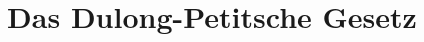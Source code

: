 

\subject{Versuch 201}
\title{Das Dulong-Petitsche Gesetz}


    \maketitle
    \thispagestyle{empty}
    \tableofcontents
    \newpage
    
    
    
    \newpage
    
    \newpage
    
    \newpage
    
    \printbibliography{}

